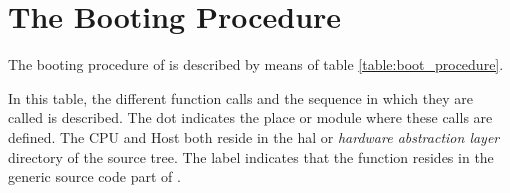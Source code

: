 %
%

\section{The Booting Procedure}

The booting procedure of \oswald is described by means of
table \ref{table:boot_procedure}. 

In this table, the different function calls and the sequence in which they
are called is described. The dot indicates the place or module where these
calls are defined. The \textsf{CPU} and \textsf{Host} both reside in the
\textsf{hal} or {\em hardware abstraction layer} directory of the \oswald source
tree. The \textsf{\oswald} label indicates that the function resides in the
generic source code part of \oswald.


